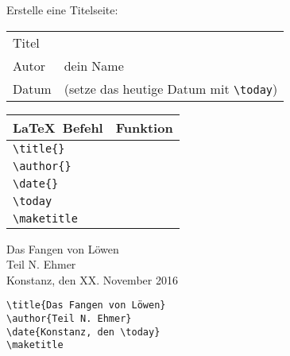 \documentclass["WS\space 16-17\space -\space LaTeX-Kurs\space -\space Praesentation\space -\space 3.tex"]{subfiles}
\begin{document}
\begin{frame}[fragile]
	\begin{Aufgabe}
		Erstelle eine Titelseite:
		\begin{center}
			\begin{tabular}{ll}
				Titel	&	\qquote{Das Fangen von Löwen}													\\
				Autor	&	dein Name																		\\
				Datum	&	\qquote{Konstanz, den XX} (setze das heutige Datum mit \lstinline[basicstyle=\normalfont\normalsize]|\today|)	\\
			\end{tabular}
		\end{center}
	\end{Aufgabe}
	\btVFill\Befehle
	\begin{center}
		\begin{tabular}{ll}
			\toprule
			\LaTeX\ Befehl									&	Funktion					\\ \midrule
			\lstinline|\title{}|	&	\\
			\lstinline|\author{}|	&	\\
			\lstinline|\date{}|		&	\\
			\lstinline|\today|		&	\\
			\lstinline|\maketitle|	&	\\
			\bottomrule
		\end{tabular}
	\end{center}
	\vspace{0.1cm}
\end{frame}
\begin{frame}[fragile]
	\Losung
	\begin{outputbox}
		\begin{center}
			\textsf{{\LARGE Das Fangen von Löwen}
			\\\vspace{0.5cm}
			Teil N. Ehmer
			\\\vspace{0.2cm}
			Konstanz, den XX. November 2016}
		\end{center}
	\end{outputbox}
		
	\Code
	\begin{lstlisting}
\title{Das Fangen von Löwen}
\author{Teil N. Ehmer}
\date{Konstanz, den \today}
\maketitle
	\end{lstlisting}
\end{frame}
\end{document}
